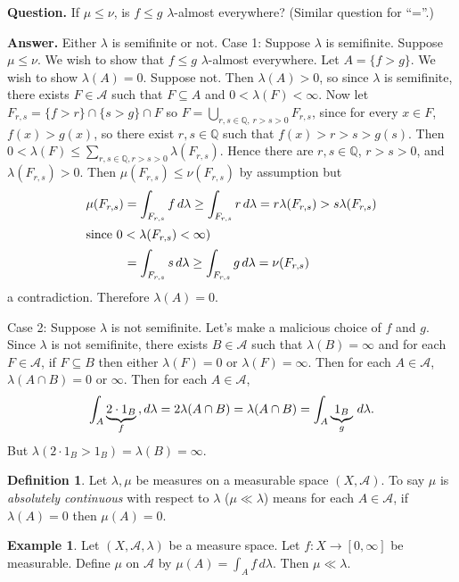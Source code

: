 \documentclass{article}
\newcommand{\Q}{\mathbb{Q}}
\theoremstyle{definition}
\newtheorem*{example}{Example}
\newtheorem*{definition}{Definition}
\begin{document}
\textbf{Question.} If $\mu \leq \nu$, is $f \leq g$ $\lambda$-almost everywhere? (Similar question for ``=''.)

\textbf{Answer.} Either $\lambda$ is semifinite or not.
Case 1: Suppose $\lambda$ is semifinite. Suppose $\mu \leq \nu$. We wish to show that $f \leq g$ $\lambda$-almost everywhere. Let $A = \{f > g\}$. 
We wish to show $\lambda(A) = 0$. Suppose not. Then $\lambda(A) > 0$, so since $\lambda$ is semifinite, there exists $F \in \mathscr{A}$ such that $F \subseteq A$ and $0 < \lambda(F) < \infty$. Now let $F_{r, s} = \{f > r\} \cap \{s > g\} \cap F$ so $F = \bigcup_{r, s \in \Q,\,r > s > 0} F_{r,s}$, since for every $x \in F$, $f(x) > g(x)$, so there exist $r, s \in \Q$ such that $f(x) > r > s > g(s)$.
Then $0 < \lambda(F) \leq \sum_{r, s \in \Q, r > s > 0} \lambda(F_{r,s})$. Hence there are $r, s \in \Q$, $r > s > 0$, and $\lambda(F_{r,s}) > 0$. Then $\mu(F_{r,s}) \leq \nu(F_{r,s})$ by assumption but 
\begin{align*}
    \mu(F_{r,s}) &= \int_{F_{r,s}} f\,d\lambda \geq \int_{F_{r,s}} r\,d\lambda = r\lambda(F_{r,s}) > s\lambda(F_{r,s}) \\
        \intertext{since $0 < \lambda(F_{r,s}) < \infty)$}
        &= \int_{F_{r,s}} s\,d\lambda \geq \int_{F_{r,s}} g\,d\lambda = \nu(F_{r,s})
\end{align*}
a contradiction. Therefore $\lambda(A) = 0$.

Case 2: Suppose $\lambda$ is not semifinite. Let's make a malicious choice of $f$ and $g$. Since $\lambda$ is not semifinite, there exists $B \in \mathscr{A}$ such that $\lambda(B) = \infty$ and for each $F \in \mathscr{A}$, if $F \subseteq B$ then either $\lambda(F) = 0$ or $\lambda(F) = \infty$. Then for each $A \in \mathscr{A}$, $\lambda(A \cap B) = 0$ or $\infty$. Then for each $A \in \mathscr{A}$,
\[
    \int_A \underbrace{2 \cdot 1_B}_f\\,d\lambda = 2\lambda(A \cap B) = \lambda(A \cap B) = \int_A \underbrace{1_B}_g\,d\lambda.
\]
But $\lambda(2\cdot 1_B > 1_B) = \lambda(B) = \infty$.

\begin{definition}
Let $\lambda, \mu$ be measures on a measurable space $(X, \mathscr{A})$. To say $\mu$ is \emph{absolutely continuous} with respect to $\lambda$ ($\mu \ll \lambda$) means for each $A \in \mathscr{A}$, if $\lambda(A) = 0$ then $\mu(A) = 0$.
\end{definition}

\begin{example}
Let $(X, \mathscr{A}, \lambda)$ be a measure space. Let $f : X \longrightarrow [0, \infty]$ be measurable. Define $\mu$ on $\mathscr{A}$ by $\mu(A) = \int_A f\,d\lambda$. Then $\mu \ll \lambda$.
\end{example}
\end{document}
